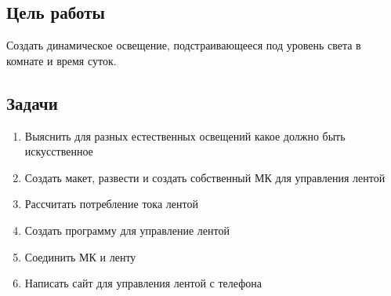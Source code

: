 \documentclass[a4paper, 12pt]{article}
\begin{document}
\subsection{Цель работы}

Создать динамическое освещение, подстраивающееся под уровень света в комнате и 
время суток.

\subsection{Задачи}
\begin{enumerate}
  \item Выяснить для разных естественных освещений какое должно быть искусственное
  \item Создать макет, развести и создать собственный МК для управления лентой
  \item Рассчитать потребление тока лентой 
  \item Создать программу для управление лентой
  \item Соединить МК и ленту
  \item Написать сайт для управления лентой с телефона 
\end{enumerate}
\\
\end{document}

